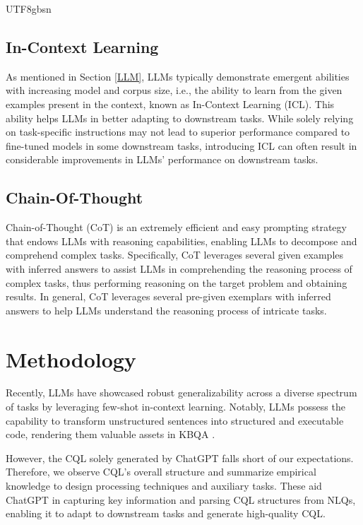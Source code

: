 \documentclass[runningheads]{llncs}
\begin{document}
\begin{CJK*}{UTF8}{gbsn}
\subsection{In-Context Learning}
As mentioned in Section \ref{LLM}, LLMs typically demonstrate emergent abilities \cite{wei2022emergent,brown2020language} with increasing model and corpus size, i.e., the ability to learn from the given examples present in the context, known as In-Context Learning (ICL). 
This ability helps LLMs in better adapting to downstream tasks. While solely relying on task-specific instructions may not lead to superior performance compared to fine-tuned models in some downstream tasks, introducing ICL can often result in considerable improvements in LLMs' performance on downstream tasks.

\subsection{Chain-Of-Thought}
Chain-of-Thought (CoT) \cite{wei2022chain} is an extremely efficient and easy prompting strategy that endows LLMs with reasoning capabilities, enabling LLMs to decompose and comprehend complex tasks. 
Specifically, CoT leverages several given examples with inferred answers to assist LLMs in comprehending the reasoning process of complex tasks, thus performing reasoning on the target problem and obtaining results.
In general, CoT leverages several pre-given exemplars with inferred answers to help LLMs understand the reasoning process of intricate tasks.



\section{Methodology}

Recently, LLMs have showcased robust generalizability across a diverse spectrum of tasks by leveraging few-shot in-context learning. Notably, LLMs possess the capability to transform unstructured sentences into structured and executable code, rendering them valuable assets in KBQA \cite{li2023few}.

However, the CQL solely generated by ChatGPT falls short of our expectations. 
Therefore, we observe CQL's overall structure and summarize empirical knowledge to design processing techniques and auxiliary tasks. 
These aid ChatGPT in capturing key information and parsing CQL structures from NLQs, enabling it to adapt to downstream tasks and generate high-quality CQL.


\end{CJK*}
\end{document}
